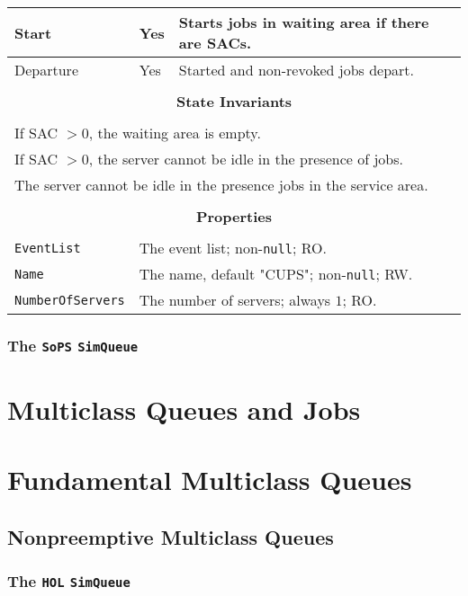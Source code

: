 \documentclass[12pt]{book}
\begin{document}
\begin{tabular}{|l|l|l|}
\hline
Start & Yes & Starts jobs in waiting area if there are SACs. \\
\hline
Departure & Yes & Started and non-revoked jobs depart. \\
\hline
\multicolumn{3}{|c|}{} \\
\multicolumn{3}{|c|}{\bf State  Invariants} \\
\multicolumn{3}{|c|}{} \\
\hline
\multicolumn{3}{|l|}{If SAC $> 0$, the waiting area is empty.} \\
\multicolumn{3}{|l|}{If SAC $> 0$, the server cannot be idle in the presence of jobs.} \\
\multicolumn{3}{|l|}{The server cannot be idle in the presence jobs in the service area.} \\
\hline
\multicolumn{3}{|c|}{} \\
\multicolumn{3}{|c|}{\bf Properties} \\
\multicolumn{3}{|c|}{} \\
\hline
\lstinline|EventList|       & \multicolumn{2}{|l|}{The event list; non-\lstinline|null|; RO.} \\
\hline
\lstinline|Name|            & \multicolumn{2}{|l|}{The name, default "CUPS"; non-\lstinline|null|; RW.} \\
\hline
\lstinline|NumberOfServers| & \multicolumn{2}{|l|}{The number of servers; always $1$; RO.} \\
\hline
\end{tabular}

\subsection{The \lstinline{SoPS} \lstinline{SimQueue}}

\chapter{Multiclass Queues and Jobs}

\chapter{Fundamental Multiclass Queues}

\section{Nonpreemptive Multiclass Queues}

\subsection{The \lstinline{HOL} \lstinline{SimQueue}}
\end{document}
